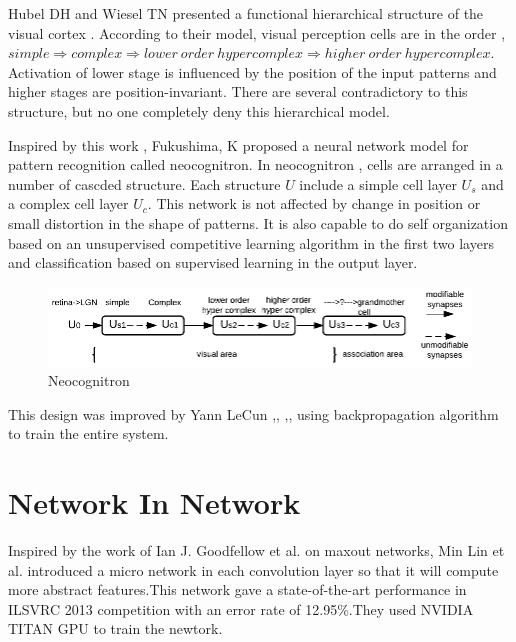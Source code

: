 \documentclass{article}
\begin{document}
\par Hubel DH and Wiesel TN \cite{Hubel1965a} presented a functional hierarchical structure of the visual cortex . According to their model, visual perception cells are in the  order , $simple\Longrightarrow complex\Longrightarrow lower \ order  \ hypercomplex  \Longrightarrow higher \ order \ hypercomplex$. Activation of  lower stage is  influenced by  the position of the input patterns and  higher stages are  position-invariant. There are several  contradictory to this structure, but no one   completely deny this hierarchical model.
\par Inspired by this work  , Fukushima, K \cite{Stark1980} proposed a neural network model for pattern recognition called neocognitron.
In neocognitron , cells are arranged in  a number of  cascded structure. Each  structure $U$ include a  simple cell layer $U_s$ and a complex cell layer $U_c$. This network is not affected by change in position or small distortion in the shape of patterns.  It is also capable to do self organization based on an unsupervised competitive learning algorithm\cite{Fukushima1982} in the first two layers and classification based on  supervised learning in the output layer.
\begin{figure}[ht]
 \includegraphics[]{Figures/neocognitron.eps}
\caption{Neocognitron\cite{Stark1980}}
\label{neo}
\end{figure}
\par This design was improved by  Yann LeCun \cite{lecun-86},\cite{lecun-89d}, \cite{lecun-89e},\cite{lecun-90c}, \cite{lecun-90e} using backpropagation algorithm\cite{BRYSON1963} to train the entire system.









\section{Network In Network }
Inspired by the work of Ian J. Goodfellow et al.\cite{Goodfellow2013} on maxout networks,  Min Lin et al.\cite{Lin2013} introduced a micro network in each convolution layer so that it will compute more abstract features.This network gave a state-of-the-art performance in  ILSVRC 2013 competition with an error rate of 12.95\%.They used NVIDIA TITAN GPU to train the newtork.
\end{document}
